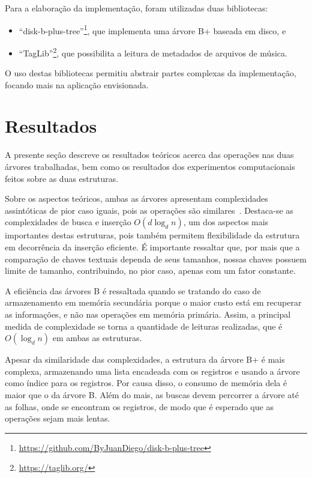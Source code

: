 \documentclass[12pt]{article}
\begin{document}
Para a elaboração da implementação, foram utilizadas duas bibliotecas: 
\begin{itemize}
  \item ``disk-b-plus-tree''\footnote{\url{https://github.com/ByJuanDiego/disk-b-plus-tree}},
    que implementa uma árvore B+ baseada em disco, e
  \item ``TagLib''\footnote{\url{https://taglib.org/}},
    que possibilita a leitura de metadados de arquivos de música.
\end{itemize}
O uso destas bibliotecas permitiu abstrair partes complexas da implementação,
focando mais na aplicação envisionada.

\section{Resultados} \label{sec:results}
A presente seção descreve os resultados teóricos acerca das operações nas duas
árvores trabalhadas, bem como os resultados dos experimentos computacionais
feitos sobre as duas estruturas.

Sobre os aspectos teóricos, ambas as árvores apresentam complexidades assintóticas
de pior caso iguais, pois as operações são similares~\cite{Co:79}.
Destaca-se as complexidades de busca e inserção $O(d \log_d n)$, um dos aspectos
mais importantes destas estruturas, pois também permitem flexibilidade da estrutura
em decorrência da inserção eficiente.
É importante ressaltar que, por mais que a comparação de chaves textuais dependa
de seus tamanhos, nossas chaves possuem limite de tamanho, contribuindo, no pior
caso, apenas com um fator constante.

A eficiência das árvores B é ressaltada quando se tratando do caso de armazenamento
em memória secundária porque o maior custo está em recuperar as informações, e 
não nas operações em memória primária.
Assim, a principal medida de complexidade se torna a quantidade de leituras
realizadas, que é $O(\log_d n)$ em ambas as estruturas.

Apesar da similaridade das complexidades, a estrutura da árvore B+ é mais complexa,
armazenando uma lista encadeada com os registros e usando a árvore como índice
para os registros.
Por causa disso, o consumo de memória dela é maior que o da árvore B.
Além do mais, as buscas devem percorrer a árvore até as folhas, onde se encontram
os registros, de modo que é esperado que as operações sejam mais lentas.
\end{document}
